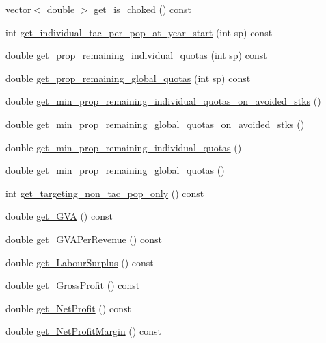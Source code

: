 \begin{DoxyCompactItemize}
\item 
vector$<$ double $>$ \mbox{\hyperlink{class_vessel_a556ed9a9a2ade567c9f0a184ea0cb65a}{get\+\_\+is\+\_\+choked}} () const
\item 
int \mbox{\hyperlink{class_vessel_a9edf70edee21d9b5520260634cff01e5}{get\+\_\+individual\+\_\+tac\+\_\+per\+\_\+pop\+\_\+at\+\_\+year\+\_\+start}} (int sp) const
\item 
double \mbox{\hyperlink{class_vessel_a956ada878183121d869c5db148aed8ac}{get\+\_\+prop\+\_\+remaining\+\_\+individual\+\_\+quotas}} (int sp) const
\item 
double \mbox{\hyperlink{class_vessel_ad6171400af65065dfe3ebec67039307e}{get\+\_\+prop\+\_\+remaining\+\_\+global\+\_\+quotas}} (int sp) const
\item 
double \mbox{\hyperlink{class_vessel_a841840154570cc35447001f175c5610e}{get\+\_\+min\+\_\+prop\+\_\+remaining\+\_\+individual\+\_\+quotas\+\_\+on\+\_\+avoided\+\_\+stks}} ()
\item 
double \mbox{\hyperlink{class_vessel_a9c7fa480ceaeeae7de8bb76a2be6edc0}{get\+\_\+min\+\_\+prop\+\_\+remaining\+\_\+global\+\_\+quotas\+\_\+on\+\_\+avoided\+\_\+stks}} ()
\item 
double \mbox{\hyperlink{class_vessel_a1c2d17f44194c3d53900f33ba660fc9b}{get\+\_\+min\+\_\+prop\+\_\+remaining\+\_\+individual\+\_\+quotas}} ()
\item 
double \mbox{\hyperlink{class_vessel_a229646cebe7caebc6f8d97c801d24b36}{get\+\_\+min\+\_\+prop\+\_\+remaining\+\_\+global\+\_\+quotas}} ()
\item 
int \mbox{\hyperlink{class_vessel_a8de78109d5763714b2a045e45a6bef09}{get\+\_\+targeting\+\_\+non\+\_\+tac\+\_\+pop\+\_\+only}} () const
\item 
double \mbox{\hyperlink{class_vessel_a165c72f151e29e2a16ce666d70c05bae}{get\+\_\+\+G\+VA}} () const
\item 
double \mbox{\hyperlink{class_vessel_adf1fcfa126cbffb62b2831067a93e83f}{get\+\_\+\+G\+V\+A\+Per\+Revenue}} () const
\item 
double \mbox{\hyperlink{class_vessel_ac529f9826cf4fcf84a43cd3412913f6d}{get\+\_\+\+Labour\+Surplus}} () const
\item 
double \mbox{\hyperlink{class_vessel_a692bd95b15f1ae09235d1e041fbaa36a}{get\+\_\+\+Gross\+Profit}} () const
\item 
double \mbox{\hyperlink{class_vessel_aa9ce440519042c9a77d381d49a1be704}{get\+\_\+\+Net\+Profit}} () const
\item 
double \mbox{\hyperlink{class_vessel_a02e543852118b7408402a988154bba6c}{get\+\_\+\+Net\+Profit\+Margin}} () const

\end{DoxyCompactItemize}
